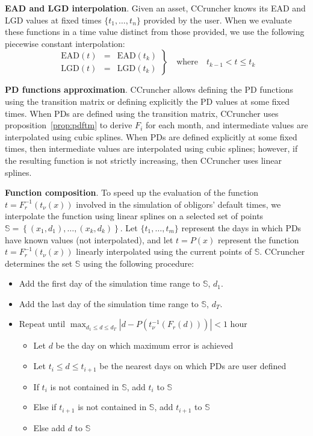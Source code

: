\documentclass[11pt,fleqn]{book} %
\begin{document}
\textbf{EAD and LGD interpolation}. Given an asset, CCruncher knows its EAD 
and LGD values at fixed times $\{t_1,\dots,t_n\}$ provided by the user. When 
we evaluate these functions in a time value distinct from those provided, we 
use the following piecewise constant interpolation:
\begin{displaymath}
  \left.
	\begin{array}{rcl}
		\text{EAD}(t) & = & \text{EAD}(t_k) \\
		\text{LGD}(t) & = & \text{LGD}(t_k)
	\end{array}
	\right\}
	\quad \text{where} \quad t_{k-1} < t \le t_{k}
\end{displaymath}

\textbf{PD functions approximation}. CCruncher allows defining the PD
functions using the transition matrix or defining explicitly the PD values
at some fixed times. When PDs are defined using the transition matrix, 
CCruncher uses proposition~\ref{prop:pdftm} to derive $F_i$ for each 
month, and intermediate values are interpolated using cubic splines. 
When PDs are defined explicitly at some fixed times, then intermediate 
values are interpolated using cubic splines; however, if the resulting 
function is not strictly increasing, then CCruncher uses linear splines.

\textbf{Function composition}. To speed up the evaluation of the function 
$t=F_r^{-1}(t_{\nu}(x))$ involved in the simulation of obligors' default 
times, we interpolate the function using linear splines on a selected set 
of points $\mathbb{S} = \left\{(x_1,d_1),\dots,(x_k,d_k)\right\}$. 
Let $\{t_1,\dots,t_m\}$ represent the days in which PDs have known values 
(not interpolated), and let $t=P(x)$ represent the function 
$t=F_r^{-1}(t_{\nu}(x))$ linearly interpolated using the current points 
of $\mathbb{S}$. CCruncher determines the set $\mathbb{S}$ using the 
following procedure:
\begin{itemize}
	\item Add the first day of the simulation time range to $\mathbb{S}$, $d_1$.
	\item Add the last day of the simulation time range to $\mathbb{S}$, $d_T$.
	\item Repeat until $\displaystyle \max_{d_1 \le d \le d_T}\left|d - P(t_{\nu}^{-1}(F_r(d)))\right| < 1$ hour
	\begin{itemize}
		\item Let $d$ be the day on which maximum error is achieved
		\item Let $t_i \le d \le t_{i+1}$ be the nearest days on which PDs are user defined
		\item If $t_i$ is not contained in $\mathbb{S}$, add $t_i$ to $\mathbb{S}$
		\item Else if $t_{i+1}$ is not contained in $\mathbb{S}$, add $t_{i+1}$ to $\mathbb{S}$
		\item Else add $d$ to $\mathbb{S}$
	\end{itemize}
\end{itemize}
\end{document}
